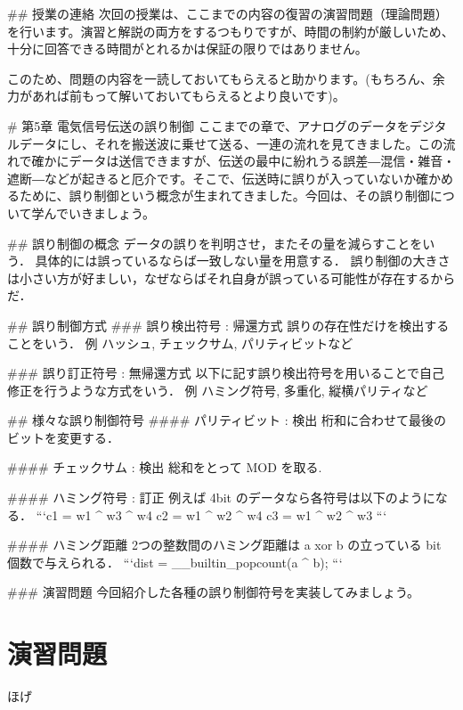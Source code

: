 ## 授業の連絡
次回の授業は、ここまでの内容の復習の演習問題（理論問題）を行います。演習と解説の両方をするつもりですが、時間の制約が厳しいため、十分に回答できる時間がとれるかは保証の限りではありません。

このため、問題の内容を一読しておいてもらえると助かります。(もちろん、余力があれば前もって解いておいてもらえるとより良いです)。

# 第5章 電気信号伝送の誤り制御
ここまでの章で、アナログのデータをデジタルデータにし、それを搬送波に乗せて送る、一連の流れを見てきました。この流れで確かにデータは送信できますが、伝送の最中に紛れうる誤差―混信・雑音・遮断―などが起きると厄介です。そこで、伝送時に誤りが入っていないか確かめるために、誤り制御という概念が生まれてきました。今回は、その誤り制御について学んでいきましょう。

## 誤り制御の概念
データの誤りを判明させ，またその量を減らすことをいう．  
具体的には誤っているならば一致しない量を用意する．  
誤り制御の大きさは小さい方が好ましい，なぜならばそれ自身が誤っている可能性が存在するからだ．  

## 誤り制御方式
### 誤り検出符号 : 帰還方式
誤りの存在性だけを検出することをいう．  
例 ハッシュ, チェックサム, パリティビットなど  

### 誤り訂正符号 : 無帰還方式
以下に記す誤り検出符号を用いることで自己修正を行うような方式をいう．  
例 ハミング符号, 多重化, 縦横パリティなど  

## 様々な誤り制御符号
#### パリティビット : 検出
桁和に合わせて最後のビットを変更する．  

#### チェックサム : 検出
総和をとって MOD を取る.

#### ハミング符号 : 訂正
例えば 4bit のデータなら各符号は以下のようになる．  
```c1 = w1 ^ w3 ^ w4  
c2 = w1 ^ w2 ^ w4  
c3 = w1 ^ w2 ^ w3  
```

#### ハミング距離
2つの整数間のハミング距離は a xor b の立っている bit 個数で与えられる．  
```dist = __builtin_popcount(a ^ b);
```

### 演習問題
今回紹介した各種の誤り制御符号を実装してみましょう。



\section{}

\section*{演習問題}
\begin{problems}
\item ほげ
\end{problems}
